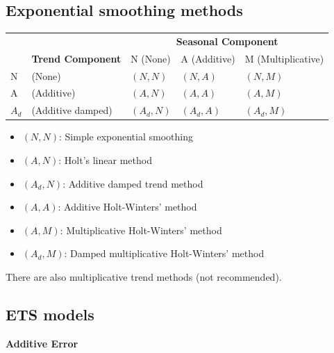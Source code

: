 \documentclass[]{book}
\providecommand{\tightlist}{%
  \setlength{\itemsep}{0pt}\setlength{\parskip}{0pt}}
\begin{document}
\hypertarget{exponential-smoothing-methods}{%
\subsection{Exponential smoothing methods}\label{exponential-smoothing-methods}}

\begin{table}[H]
\begin{tabular}{lllll}
      &                          & \multicolumn{3}{c}{\textbf{Seasonal Component}} \\
      & \textbf{Trend Component} & N (None)  & A (Additive)  & M (Multiplicative)  \\
N     &    (None)                      &  $(N,N)$          &  $(N,A)$              &       $(N,M)$               \\
A     &     (Additive)                     &  $(A,N)$          &     $(A,A)$          &         $(A,M)$              \\
$A_d$ &  (Additive damped)                         &       $(A_d,N)$    &      $(A_d,A)$          &    $(A_d,M)$                 
\end{tabular}
\end{table}

\begin{itemize}
\tightlist
\item
  \((N,N)\): Simple exponential smoothing
\item
  \((A,N)\): Holt's linear method
\item
  \((A_d,N)\): Additive damped trend method
\item
  \((A,A)\): Additive Holt-Winters' method
\item
  \((A,M)\): Multiplicative Holt-Winters' method
\item
  \((A_d,M)\): Damped multiplicative Holt-Winters' method
\end{itemize}

There are also multiplicative trend methods (not recommended).

\hypertarget{ets-models}{%
\subsection{ETS models}\label{ets-models}}

\textbf{Additive Error}
\end{document}
